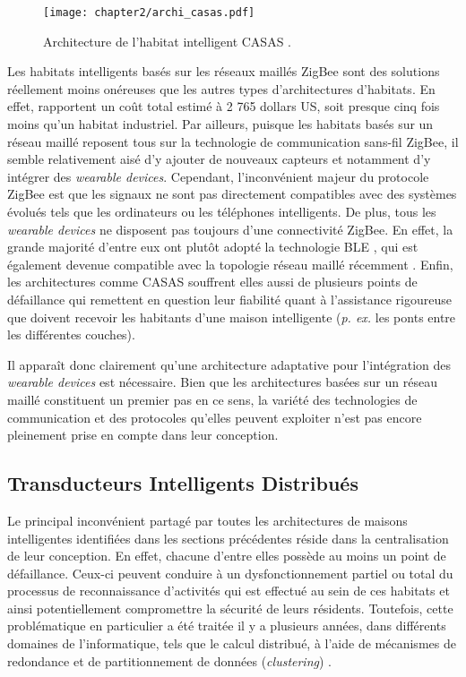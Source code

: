 \begin{figure}[H]
	\centering
	\texttt{[image: chapter2/archi\_casas.pdf]}
	\caption[Architecture de l'habitat intelligent CASAS.]{Architecture de l'habitat intelligent CASAS \citep{Cook2013}.}
	\label{fig:archi_casas}
\end{figure}

Les habitats intelligents basés sur les réseaux maillés ZigBee sont des solutions réellement moins onéreuses que les autres types d'architectures d'habitats. En effet, \cite{Cook2013} rapportent un coût total estimé à 2 765 dollars US, soit presque cinq fois moins qu'un habitat industriel. Par ailleurs, puisque les habitats basés sur un réseau maillé reposent tous sur la technologie de communication sans-fil ZigBee, il semble relativement aisé d'y ajouter de nouveaux capteurs et notamment d'y intégrer des \textit{wearable devices}. Cependant, l'inconvénient majeur du protocole ZigBee est que les signaux ne sont pas directement compatibles avec des systèmes évolués tels que les ordinateurs ou les téléphones intelligents. De plus, tous les \textit{wearable devices} ne disposent pas toujours d'une connectivité ZigBee. En effet, la grande majorité d'entre eux ont plutôt adopté la technologie \ac{BLE} \citep{Martin2014}, qui est également devenue compatible avec la topologie réseau maillé récemment \citep{Bluetooth2017}. Enfin, les architectures comme CASAS souffrent elles aussi de plusieurs points de défaillance qui remettent en question leur fiabilité quant à l'assistance rigoureuse que doivent recevoir les habitants d'une maison intelligente (\textit{p. ex.} les ponts entre les différentes couches).

Il apparaît donc clairement qu'une architecture adaptative pour l'intégration des \textit{wearable devices} est nécessaire. Bien que les architectures basées sur un réseau maillé constituent un premier pas en ce sens, la variété des technologies de communication et des protocoles qu'elles peuvent exploiter n'est pas encore pleinement prise en compte dans leur conception.

\subsection{Transducteurs Intelligents Distribués}

Le principal inconvénient partagé par toutes les architectures de maisons intelligentes identifiées dans les sections précédentes réside dans la centralisation de leur conception. En effet, chacune d'entre elles possède au moins un point de défaillance. Ceux-ci peuvent conduire à un dysfonctionnement partiel ou total du processus de reconnaissance d'activités qui est effectué au sein de ces habitats et ainsi potentiellement compromettre la sécurité de leurs résidents. Toutefois, cette problématique en particulier a été traitée il y a plusieurs années, dans différents domaines de l'informatique, tels que le calcul distribué, à l'aide de mécanismes de redondance et de partitionnement de données (\textit{clustering}) \citep{Dikaiakos2009,Zaharia2010,JafarnejadGhomi2017}.

